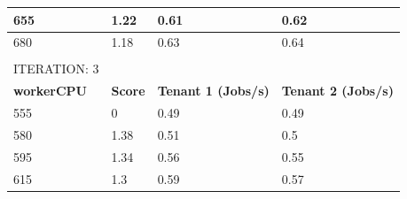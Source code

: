 \begin{table}[H]
\begin{tabular}{llll}
\multicolumn{1}{|l|}{655}                & \multicolumn{1}{l|}{1.22}           & \multicolumn{1}{l|}{0.61}                       & \multicolumn{1}{l|}{0.62}                       \\ \hline
\multicolumn{1}{|l|}{680}                & \multicolumn{1}{l|}{1.18}           & \multicolumn{1}{l|}{0.63}                       & \multicolumn{1}{l|}{0.64}                       \\ \hline
                                         &                                     &                                                 &                                                 \\
ITERATION: 3                             &                                     &                                                 &                                                 \\ \hline
\multicolumn{1}{|l|}{\textbf{workerCPU}} & \multicolumn{1}{l|}{\textbf{Score}} & \multicolumn{1}{l|}{\textbf{Tenant 1  (Jobs/s)}} & \multicolumn{1}{l|}{\textbf{Tenant 2  (Jobs/s)}} \\ \hline
\multicolumn{1}{|l|}{555}                & \multicolumn{1}{l|}{0}              & \multicolumn{1}{l|}{0.49}                       & \multicolumn{1}{l|}{0.49}                       \\ \hline
\multicolumn{1}{|l|}{580}                & \multicolumn{1}{l|}{1.38}           & \multicolumn{1}{l|}{0.51}                       & \multicolumn{1}{l|}{0.5}                        \\ \hline
\multicolumn{1}{|l|}{595}                & \multicolumn{1}{l|}{1.34}           & \multicolumn{1}{l|}{0.56}                       & \multicolumn{1}{l|}{0.55}                       \\ \hline
\multicolumn{1}{|l|}{615}                & \multicolumn{1}{l|}{1.3}            & \multicolumn{1}{l|}{0.59}                       & \multicolumn{1}{l|}{0.57}                       \\ \hline
\end{tabular}
\end{table}




